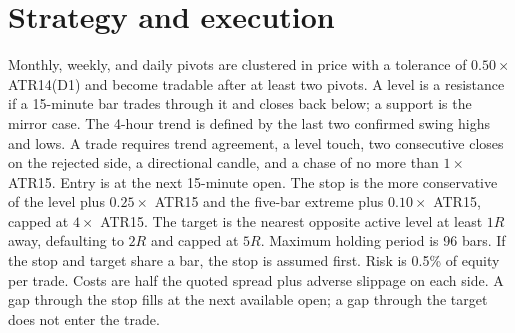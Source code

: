\documentclass[11pt,a4paper]{article}
\begin{document}
\section{Strategy and execution}
Monthly, weekly, and daily pivots are clustered in price with a tolerance of $0.50\times$ ATR14(D1) and become tradable after at least two pivots. A level is a resistance if a 15-minute bar trades through it and closes back below; a support is the mirror case. The 4-hour trend is defined by the last two confirmed swing highs and lows. A trade requires trend agreement, a level touch, two consecutive closes on the rejected side, a directional candle, and a chase of no more than $1\times$ ATR15. Entry is at the next 15-minute open.
The stop is the more conservative of the level plus $0.25\times$ ATR15 and the five-bar extreme plus $0.10\times$ ATR15, capped at $4\times$ ATR15. The target is the nearest opposite active level at least $1R$ away, defaulting to $2R$ and capped at $5R$. Maximum holding period is 96 bars. If the stop and target share a bar, the stop is assumed first. Risk is 0.5\% of equity per trade. Costs are half the quoted spread plus adverse slippage on each side. A gap through the stop fills at the next available open; a gap through the target does not enter the trade.
\end{document}
